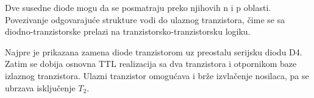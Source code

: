 Dve susedne diode mogu da se posmatraju preko njihovih n i p oblasti. Povezivanje odgovarajuće strukture vodi do ulaznog tranzistora, čime se sa diodno-tranzistorske prelazi na tranzistorsko-tranzistorsku logiku.

Najpre je prikazana zamena diode tranzistorom uz preostalu serijsku diodu D4. Zatim se dobija osnovna TTL realizacija sa dva tranzistora i otpornikom baze izlaznog tranzistora. Ulazni tranzistor omogućava i brže izvlačenje nosilaca, pa se ubrzava isključenje $T_2$.
